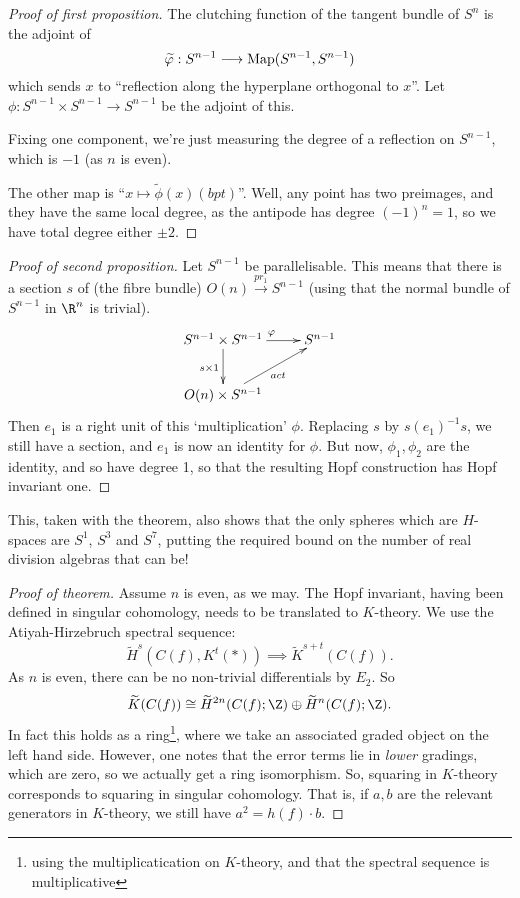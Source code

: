 \documentclass[11pt]{article}
\begin{document}
\begin{MarkusHopfInvOne}
\begin{proof}[Proof of first proposition]
The clutching function of the tangent bundle of $S^n$ is the adjoint of
\[\widetilde{\varphi}:S^{n-1}\longrightarrow \operatorname{Map}(S^{n-1},S^{n-1})\]
which sends $x$ to ``reflection along the hyperplane orthogonal to $x$''. Let $\phi:S^{n-1}\times S^{n-1}\to S^{n-1}$ be the adjoint of this.

Fixing one component, we're just measuring the degree of a reflection on $S^{n-1}$, which is $-1$ (as $n$ is even).

The other map is ``$x\mapsto \widetilde\phi(x)(bpt)$''. Well, any point has two preimages, and they have the same local degree, as the antipode has degree $(-1)^n=1$, so we have total degree either $\pm2$.
\end{proof}
\begin{proof}[Proof of second proposition]
Let $S^{n-1}$ be parallelisable. This means that there is a section $s$ of (the fibre bundle) $O(n)\overset{pr_1}{\to}S^{n-1}$ (using that the normal bundle of $S^{n-1}$ in $\R^n$ is trivial).
\[\xymatrix{S^{n-1}\times S^{n-1}\ar[r]^\phi\ar[d]_{s\times 1}&S^{n-1}\\
O(n)\times S^{n-1}\ar[ur]_{act}&
}\]
Then $e_1$ is a right unit of this `multiplication' $\phi$. Replacing $s$ by $s(e_1)^{-1}s$, we still have a section, and $e_1$ is now an identity for $\phi$. But now, $\phi_1,\phi_2$ are the identity, and so have degree 1, so that the resulting Hopf construction has Hopf invariant one.
\end{proof}
\noindent This, taken with the theorem, also shows that the only spheres which are $H$-spaces are $S^1$, $S^3$ and $S^7$, putting the required bound on the number of real division algebras that can be!
\begin{proof}[Proof of theorem]
Assume $n$ is even, as we may.
The Hopf invariant, having been defined in singular cohomology, needs to be translated to $K$-theory. We use the Atiyah-Hirzebruch spectral sequence:
\[\widetilde H^s(C(f),K^t(\ast))\implies \widetilde K^{s+t}(C(f)).\]
As $n$ is even, there can be no non-trivial differentials by $E_2$. So 
\[\widetilde K(C(f))\cong\widetilde H^{2n}(C(f);\Z)\oplus \widetilde H^n(C(f);\Z).\]
In fact this holds as a ring\footnote{using the multiplicatication on $K$-theory, and that the spectral sequence is multiplicative}, where we take an associated graded object on the left hand side. However, one notes that the error terms lie in \emph{lower} gradings, which are zero, so we actually get a ring isomorphism. So, squaring in $K$-theory corresponds to squaring in singular cohomology. That is, if $a,b$ are the relevant generators  in $K$-theory, we still have $a^2=h(f)\cdot b$.


\end{proof}
\end{MarkusHopfInvOne}
\end{document}
